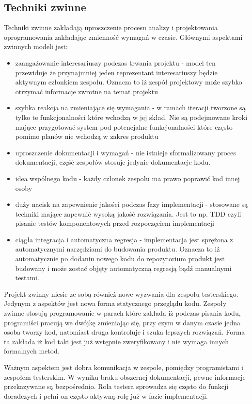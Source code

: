 \subsection{Techniki zwinne}
Techniki zwinne zakładają uproszczenie procesu analizy i projektowania oprogramowania zakładając zmienność wymagań w czasie. Głównymi aspektami zwinnych modeli jest:
\begin{itemize}
  \item zaangażowanie interesariuszy podczas trwania projektu - model ten przewiduje że przynajmniej jeden reprezentant interesariuszy będzie aktywnym członkiem zespołu. Oznacza to iż zespół projektowy może szybko otrzymać informacje zwrotne na temat projektu
  \item szybka reakcja na zmieniające się wymagania - w ramach iteracji tworzone są tylko te funkcjonalności które wchodzą w jej skład. Nie są podejmowane kroki mające przygotować system pod potencjalne funkcjonalności które często pomimo planów nie wchodzą w zakres produktu 
  \item uproszczenie dokumentacji i wymagań - nie istnieje sformalizowany proces dokumentacji, część zespołów stosuje jedynie dokumentacje kodu.
  \item idea wspólnego kodu - każdy członek zespołu ma prawo poprawić kod innej osoby
  \item duży nacisk na zapewnienie jakości podczas fazy implementacji - stosowane są techniki mające zapewnić wysoką jakość rozwiązania. Jest to np. TDD czyli pisanie testów komponentowych przed rozpoczęciem implementacji
  \item ciągła integracja i automatyczna regresja - implementacja jest sprężona z automatycznymi narzędziami do budowania produktu. Oznacza to iż automatycznie po dodaniu nowego kodu do repozytorium produkt jest budowany i może zostać objęty automatyczną regresją bądź manualnymi testami.
\end{itemize}
Projekt zwinny niesie ze sobą również nowe wyzwania dla zespołu testerskiego. Jedynym z aspektów jest nowa forma statycznego przeglądu kodu. Zespoły zwinne stosują programowanie w parach które zakłada iż podczas pisania kodu, programiści pracują we dwójkę zmieniając się, przy czym w danym czasie jedna osoba tworzy kod, natomiast druga kontroluje i szuka lepszych rozwiązań. Forma ta zakłada iż kod taki jest już wstępnie zweryfikowany i nie wymaga innych formalnych metod. 

Ważnym aspektem jest dobra komunikacja w zespole, pomiędzy programistami i zespołem testerskim. W wyniku braku obszernej dokumentacji, pewne informacje przekazywane są bezpośrednio. Rola testera sprowadza się często do funkcji doradczych i pełni on często aktywną rolę już w fazie implementacji.

